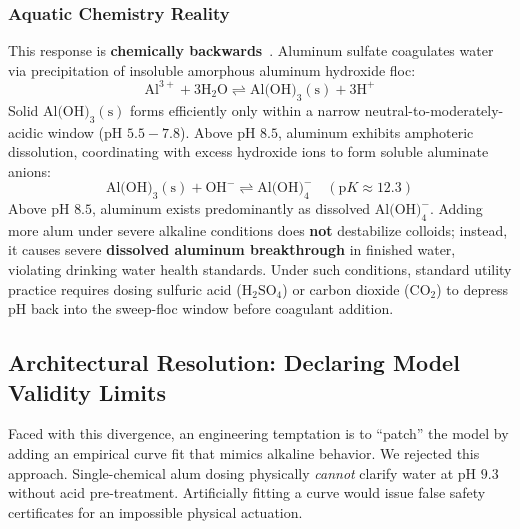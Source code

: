 \documentclass[10pt,twocolumn,letterpaper]{article}
\theoremstyle{definition}
\begin{document}
\subsubsection{Aquatic Chemistry Reality}
This response is \textbf{chemically backwards}~\cite{stumm1996aquatic,crittenden2012mwh,epa1999enhanced}. Aluminum sulfate coagulates water via precipitation of insoluble amorphous aluminum hydroxide floc:
\begin{equation}
\text{Al}^{3+} + 3\text{H}_2\text{O} \rightleftharpoons \text{Al(OH)}_3(\text{s}) + 3\text{H}^+
\end{equation}
Solid $\text{Al(OH)}_3(\text{s})$ forms efficiently only within a narrow neutral-to-moderately-acidic window ($\text{pH } 5.5 - 7.8$). Above $\text{pH } 8.5$, aluminum exhibits amphoteric dissolution, coordinating with excess hydroxide ions to form soluble aluminate anions:
\begin{equation}
\text{Al(OH)}_3(\text{s}) + \text{OH}^- \rightleftharpoons \text{Al(OH)}_4^- \quad (\text{p}K \approx 12.3)
\end{equation}
Above $\text{pH } 8.5$, aluminum exists predominantly as dissolved $\text{Al(OH)}_4^-$. Adding more alum under severe alkaline conditions does \textbf{not} destabilize colloids; instead, it causes severe \textbf{dissolved aluminum breakthrough} in finished water, violating drinking water health standards. Under such conditions, standard utility practice requires dosing sulfuric acid ($\text{H}_2\text{SO}_4$) or carbon dioxide ($\text{CO}_2$) to depress pH back into the sweep-floc window before coagulant addition.

\subsection{Architectural Resolution: Declaring Model Validity Limits}
Faced with this divergence, an engineering temptation is to ``patch'' the model by adding an empirical curve fit that mimics alkaline behavior. We rejected this approach. Single-chemical alum dosing physically \textit{cannot} clarify water at $\text{pH } 9.3$ without acid pre-treatment. Artificially fitting a curve would issue false safety certificates for an impossible physical actuation.
\end{document}
